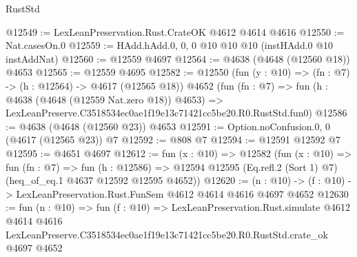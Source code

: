 \begin{lexlean}{RustStd}
\begin{coremodule}
@12549 := LexLeanPreservation.Rust.CrateOK @4612 @4614 @4616
@12550 := Nat.casesOn.{0}
@12559 := HAdd.hAdd.{0, 0, 0} @10 @10 @10 (instHAdd.{0} @10 instAddNat)
@12560 := @12559 @4697
@12564 := @4638 (@4648 (@12560 @18)) @4653
@12565 := @12559 @4695
@12582 := @12550
    (fun (y : @10) => (fn : @7) -> (h : @12564) -> @4617 (@12565 @18))
    @4652
    (fun (fn : @7) =>
    fun (h : @4638 (@4648 (@12559 Nat.zero @18)) @4653) =>
    LexLeanPreserve.C3518534ec0ae1f19e13c71421cc5be20.R0.RustStd.fun0)
@12586 := @4638 (@4648 (@12560 @23)) @4653
@12591 := Option.noConfusion.{0, 0} (@4617 (@12565 @23)) @7
@12592 := @808 @7
@12594 := @12591 @12592 @7
@12595 := @4651 @4697
@12612 := fun (x : @10) =>
  @12582
    (fun (x : @10) =>
    fun (fn : @7) =>
    fun (h : @12586) =>
    @12594 @12595 (Eq.refl.{2} (Sort 1) @7) (heq_of_eq.{1} @4637 @12592 @12595 @4652))
@12620 := (n : @10) -> (f : @10) -> LexLeanPreservation.Rust.FunSem @4612 @4614 @4616 @4697 @4652
@12630 := fun (n : @10) =>
  fun (f : @10) =>
  LexLeanPreservation.Rust.simulate
    @4612
    @4614
    @4616
    LexLeanPreserve.C3518534ec0ae1f19e13c71421cc5be20.R0.RustStd.crate_ok
    @4697
    @4652
\end{coremodule}
\end{lexlean}
